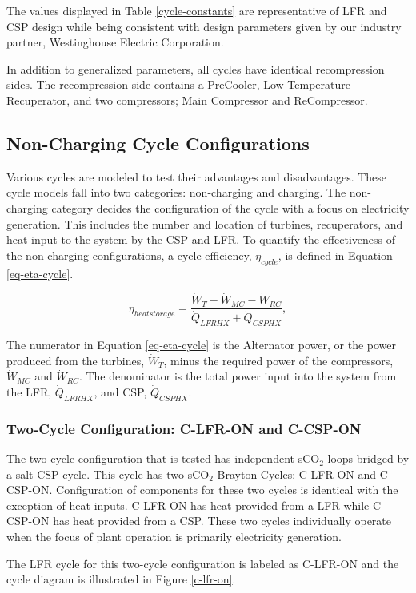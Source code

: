 \begin{paracol}{2}
The values displayed in Table \ref{cycle-constants} are representative of LFR and CSP design while being consistent with design parameters given by our industry partner, Westinghouse Electric Corporation.

In addition to generalized parameters, all cycles have identical recompression sides. The recompression side contains a PreCooler, Low Temperature Recuperator, and two compressors; Main Compressor and ReCompressor.

\subsection{Non-Charging Cycle Configurations}%
Various cycles are modeled to test their advantages and disadvantages. These cycle models fall into two categories: non-charging and charging. The non-charging category decides the configuration of the cycle with a focus on electricity generation. This includes the number and location of turbines, recuperators, and heat input to the system by the CSP and LFR. To quantify the effectiveness of the non-charging configurations, a cycle efficiency, $\eta_{cycle}$, is defined in Equation \ref{eq-eta-cycle}.

\begin{equation}
    \label{eq-eta-cycle}
    \eta_{heatstorage} = \frac{\dot{W}_{T}-\dot{W}_{MC}-\dot{W}_{RC}}{\dot{Q}_{LFRHX}+\dot{Q}_{CSPHX}},
\end{equation}

The numerator in Equation \ref{eq-eta-cycle} is the Alternator power, or the power produced from the turbines, $\dot{W}_{T}$, minus the required power of the compressors, $\dot{W}_{MC}$ and $\dot{W}_{RC}$. The denominator is the total power input into the system from the LFR, $\dot{Q}_{LFRHX}$, and CSP, $\dot{Q}_{CSPHX}$.


\subsubsection{Two-Cycle Configuration: C-LFR-ON and C-CSP-ON} %

The two-cycle configuration that is tested has independent sCO$_{2}$ loops bridged by a salt CSP cycle. This cycle has two sCO$_{2}$ Brayton Cycles: C-LFR-ON and C-CSP-ON. Configuration of components for these two cycles is identical with the exception of heat inputs. C-LFR-ON has heat provided from a LFR while C-CSP-ON has heat provided from a CSP. These two cycles individually operate when the focus of plant operation is primarily electricity generation.

The LFR cycle for this two-cycle configuration is labeled as C-LFR-ON and the cycle diagram is illustrated in Figure \ref{c-lfr-on}.

\end{paracol}
